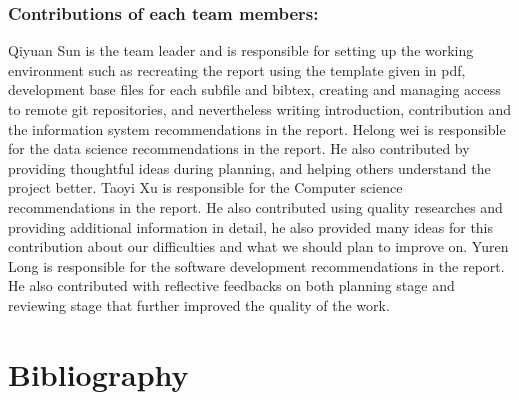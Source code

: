 \documentclass{article}
\begin{document}
	\subsubsection{Contributions of each team members:}
	Qiyuan Sun is the team leader and is responsible for setting up the working environment such as recreating the report using the template given in pdf, development base files for each subfile and bibtex, creating and managing access to remote git repositories, and nevertheless writing introduction, contribution and the information system recommendations in the report.
	Helong wei is responsible for the data science recommendations in the report. He also contributed by providing thoughtful ideas during planning, and helping others understand the project better.
	Taoyi Xu is responsible for the Computer science recommendations in the report. He also contributed using quality researches and providing additional information in detail, he also provided many ideas for this contribution about our difficulties and what we should plan to improve on.
	Yuren Long is responsible for the software development recommendations in the report. He also contributed with reflective feedbacks on both planning stage and reviewing stage that further improved the quality of the work.
	\pagebreak
\section{Bibliography}
	\nocite{*}
	
	
\end{document}
